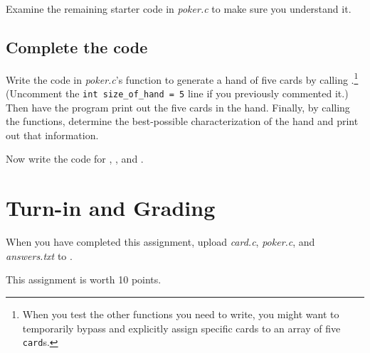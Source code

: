 Examine the remaining starter code in \textit{poker.c} to make sure you
understand it.

\subsection{Complete the code}

Write the code in \textit{poker.c}'s  function to generate a
hand of five cards by calling .\footnote{When you test the
other functions you need to write, you might want to temporarily bypass
 and explicitly assign specific cards to an array of five
\lstinline{card}s.}  (Uncomment the \lstinline{int size_of_hand = 5} line if you
previously commented it.)  Then have the program print out the five cards in
the hand. Finally, by calling the  functions, determine the
best-possible characterization of the hand and print out that information.

Now write the code for , , and
.

\section{Turn-in and Grading}

When you have completed this assignment, upload \textit{card.c},
\textit{poker.c}, and \textit{answers.txt} to \filesubmission.

This assignment is worth 10 points.
\begin{description}
\end{description}


